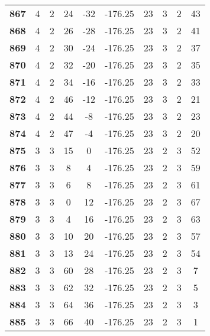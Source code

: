 \documentclass[12pt,letterpaper, onecolumn]{exam}
\begin{document}
\begin{longtable}{cccccccccc}
    \textbf{867} & 4 & 2 & 24 & -32 & -176.25 & 23 & 3 & 2 & 43 \\ 
    \textbf{868} & 4 & 2 & 26 & -28 & -176.25 & 23 & 3 & 2 & 41 \\ 
    \textbf{869} & 4 & 2 & 30 & -24 & -176.25 & 23 & 3 & 2 & 37 \\ 
    \textbf{870} & 4 & 2 & 32 & -20 & -176.25 & 23 & 3 & 2 & 35 \\ 
    \textbf{871} & 4 & 2 & 34 & -16 & -176.25 & 23 & 3 & 2 & 33 \\ 
    \textbf{872} & 4 & 2 & 46 & -12 & -176.25 & 23 & 3 & 2 & 21 \\ 
    \textbf{873} & 4 & 2 & 44 & -8 & -176.25 & 23 & 3 & 2 & 23 \\ 
    \textbf{874} & 4 & 2 & 47 & -4 & -176.25 & 23 & 3 & 2 & 20 \\ 
    \textbf{875} & 3 & 3 & 15 & 0 & -176.25 & 23 & 2 & 3 & 52 \\ 
    \textbf{876} & 3 & 3 & 8 & 4 & -176.25 & 23 & 2 & 3 & 59 \\ 
    \textbf{877} & 3 & 3 & 6 & 8 & -176.25 & 23 & 2 & 3 & 61 \\ 
    \textbf{878} & 3 & 3 & 0 & 12 & -176.25 & 23 & 2 & 3 & 67 \\ 
    \textbf{879} & 3 & 3 & 4 & 16 & -176.25 & 23 & 2 & 3 & 63 \\ 
    \textbf{880} & 3 & 3 & 10 & 20 & -176.25 & 23 & 2 & 3 & 57 \\ 
    \textbf{881} & 3 & 3 & 13 & 24 & -176.25 & 23 & 2 & 3 & 54 \\ 
    \textbf{882} & 3 & 3 & 60 & 28 & -176.25 & 23 & 2 & 3 & 7 \\ 
    \textbf{883} & 3 & 3 & 62 & 32 & -176.25 & 23 & 2 & 3 & 5 \\ 
    \textbf{884} & 3 & 3 & 64 & 36 & -176.25 & 23 & 2 & 3 & 3 \\ 
    \textbf{885} & 3 & 3 & 66 & 40 & -176.25 & 23 & 2 & 3 & 1 \\ \hline
\end{longtable}
\end{document}
